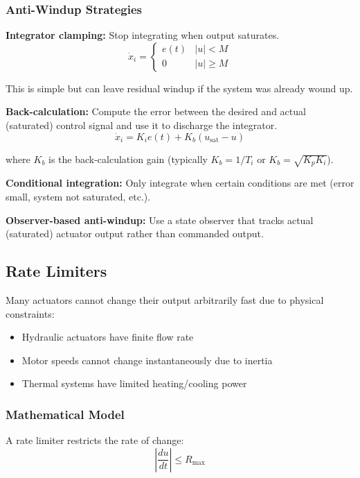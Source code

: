 \subsubsection{Anti-Windup Strategies}

\textbf{Integrator clamping:} Stop integrating when output saturates.
\begin{equation}
\dot{x}_i = \begin{cases}
e(t) & |u| < M \\
0 & |u| \geq M
\end{cases}
\end{equation}

This is simple but can leave residual windup if the system was already wound up.

\textbf{Back-calculation:} Compute the error between the desired and actual (saturated) control signal and use it to discharge the integrator.
\begin{equation}
\dot{x}_i = K_i e(t) + K_b(u_{\text{sat}} - u)
\end{equation}

where $K_b$ is the back-calculation gain (typically $K_b = 1/T_i$ or $K_b = \sqrt{K_p K_i}$).

\textbf{Conditional integration:} Only integrate when certain conditions are met (error small, system not saturated, etc.).

\textbf{Observer-based anti-windup:} Use a state observer that tracks actual (saturated) actuator output rather than commanded output.

\subsection{Rate Limiters}

Many actuators cannot change their output arbitrarily fast due to physical constraints:
\begin{itemize}
    \item Hydraulic actuators have finite flow rate
    \item Motor speeds cannot change instantaneously due to inertia
    \item Thermal systems have limited heating/cooling power
\end{itemize}

\subsubsection{Mathematical Model}

A rate limiter restricts the rate of change:
\begin{equation}
\left|\frac{du}{dt}\right| \leq R_{\max}
\label{eq:rate_limit}
\end{equation}

